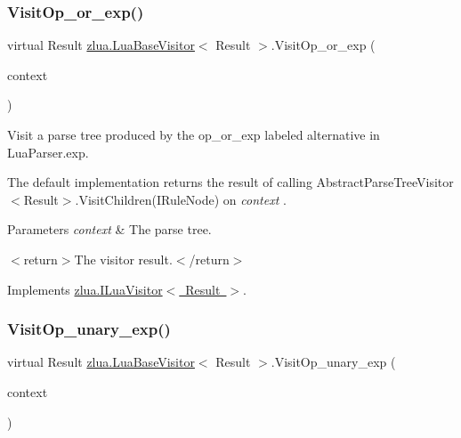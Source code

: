 \subsubsection{\texorpdfstring{Visit\+Op\+\_\+or\+\_\+exp()}{VisitOp\_or\_exp()}}
{\footnotesize\ttfamily virtual Result \mbox{\hyperlink{classzlua_1_1_lua_base_visitor}{zlua.\+Lua\+Base\+Visitor}}$<$ Result $>$.Visit\+Op\+\_\+or\+\_\+exp (\begin{DoxyParamCaption}\item[{\mbox{[}\+Not\+Null\mbox{]} \mbox{\hyperlink{classzlua_1_1_lua_parser_1_1_op__or__exp_context}{Lua\+Parser.\+Op\+\_\+or\+\_\+exp\+Context}}}]{context }\end{DoxyParamCaption})\hspace{0.3cm}{\ttfamily [virtual]}}



Visit a parse tree produced by the {\ttfamily op\+\_\+or\+\_\+exp} labeled alternative in Lua\+Parser.\+exp. 

The default implementation returns the result of calling Abstract\+Parse\+Tree\+Visitor$<$\+Result$>$.\+Visit\+Children(\+I\+Rule\+Node) on {\itshape context} . 


\begin{DoxyParams}{Parameters}
{\em context} & The parse tree.\\
\hline
\end{DoxyParams}
$<$return$>$The visitor result.$<$/return$>$ 

Implements \mbox{\hyperlink{interfacezlua_1_1_i_lua_visitor_a5be60a214f1dc7a39004e5d741ef50b4}{zlua.\+I\+Lua\+Visitor$<$ Result $>$}}.

\mbox{\label{classzlua_1_1_lua_base_visitor_a36b016a0f996e60c5aa18d5d06394eb4}} 
\subsubsection{\texorpdfstring{Visit\+Op\+\_\+unary\+\_\+exp()}{VisitOp\_unary\_exp()}}
{\footnotesize\ttfamily virtual Result \mbox{\hyperlink{classzlua_1_1_lua_base_visitor}{zlua.\+Lua\+Base\+Visitor}}$<$ Result $>$.Visit\+Op\+\_\+unary\+\_\+exp (\begin{DoxyParamCaption}\item[{\mbox{[}\+Not\+Null\mbox{]} \mbox{\hyperlink{classzlua_1_1_lua_parser_1_1_op__unary__exp_context}{Lua\+Parser.\+Op\+\_\+unary\+\_\+exp\+Context}}}]{context }\end{DoxyParamCaption})\hspace{0.3cm}{\ttfamily [virtual]}}



